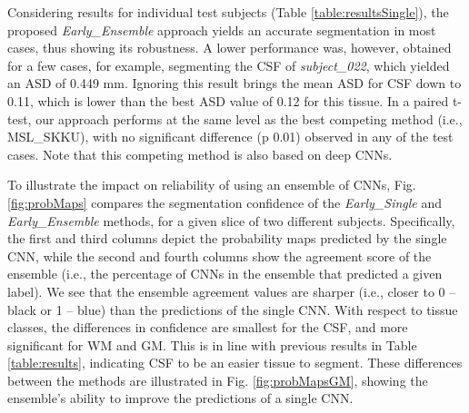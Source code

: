\documentclass[twoside,espcrc2]{elsarticle}
\begin{document}
Considering results for individual test subjects (Table \ref{table:resultsSingle}), the proposed \textit{Early\_Ensemble} approach yields an accurate segmentation in most cases, thus showing its robustness. A lower performance was, however, obtained for a few cases, for example, segmenting the CSF of \textit{subject\_022}, which yielded an ASD of 0.449 mm. Ignoring this result brings the mean ASD for CSF down to 0.11, which is lower than the best ASD value of 0.12 for this tissue. 
In a paired t-test, 
our approach performs at the same level as the best competing method (i.e., MSL\_SKKU), with no significant difference (p  0.01) observed in any of the test cases. Note that this competing method is also based on deep CNNs. 


To illustrate the impact on reliability of using an ensemble of CNNs, Fig. \ref{fig:probMaps} compares the segmentation confidence of the \textit{Early\_Single} and \textit{Early\_Ensemble} methods, for a given slice of two different subjects. Specifically, the first and third columns depict the probability maps predicted by the single CNN, while the second and fourth columns show the agreement score of the ensemble (i.e., the percentage of CNNs in the ensemble that predicted a given label). We see that the ensemble agreement values are sharper (i.e., closer to 0 -- black or 1 -- blue) than the predictions of the single CNN. With respect to tissue classes, the differences in confidence are smallest for the CSF, and more significant for WM and GM. This is in line with previous results in Table \ref{table:results}, indicating CSF to be an easier tissue to segment. These differences between the methods are illustrated in Fig. \ref{fig:probMapsGM}, showing the ensemble's ability to improve the predictions of a single CNN. 
\end{document}
